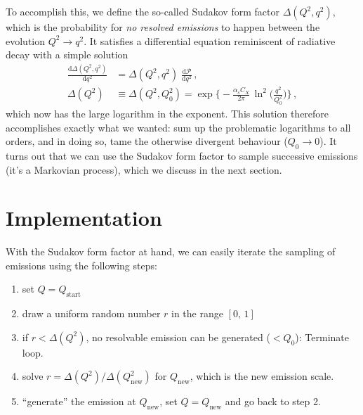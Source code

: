 \documentclass[11pt]{article}
\begin{document}
To accomplish this, we define the so-called Sudakov form factor \(\Delta(Q^2,q^2)\), which is the probability for \emph{no resolved emissions} to happen between the evolution \(Q^2 \to q^2\).
It satisfies a differential equation reminiscent of radiative decay with a simple solution
\begin{align}
  \frac{\mathrm{d}\Delta(Q^2,q^2)}{\mathrm{d}q^2}
  &=
  \Delta(Q^2,q^2) \; \frac{\mathrm{d}\mathcal{P}}{\mathrm{d}q^2}
  \,,\nonumber\\
  \Delta(Q^2)
  &\equiv \Delta(Q^2,Q_0^2)
  =
  \exp\biggl\{-\frac{\alpha_s C_X}{2\pi} \, \ln^2\biggl(\frac{q^2}{Q_0^2}\biggr) \biggr\}
  \,,
\end{align}
which now has the large logarithm in the exponent.
This solution therefore accomplishes exactly what we wanted: sum up the problematic logarithms to all orders, and in doing so, tame the otherwise divergent behaviour (\(Q_0\to0\)).
It turns out that we can use the Sudakov form factor to sample successive emissions (it's a Markovian process), which we discuss in the next section.

\section{Implementation}
\label{sec:org087d460}

With the Sudakov form factor at hand, we can easily iterate the sampling of emissions using the following steps:
\begin{enumerate}
\item set \(Q = Q_\mathrm{start}\)
\item draw a uniform random number \(r\) in the range \([0,\,1]\)
\item if \(r<\Delta(Q^2)\), no resolvable emission can be generated (\(<Q_0\)):
Terminate loop.
\item solve \(r = \Delta(Q^2) / \Delta(Q_\mathrm{new}^2)\) for \(Q_\mathrm{new}\), which is the new emission scale.
\item ``generate'' the emission at \(Q_\mathrm{new}\), set \(Q = Q_\mathrm{new}\) and go back to step 2.
\end{enumerate}
\end{document}
